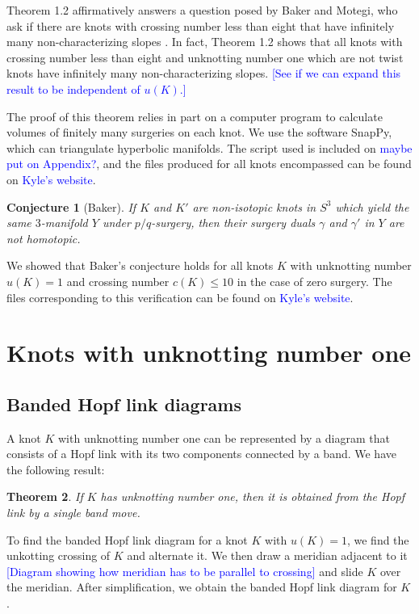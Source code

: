 \documentclass[11pt,usenames,dvipsnames,reqno]{amsart}
\newtheorem{theorem}{Theorem}
\numberwithin{theorem}{section}
\newtheorem{conjecture}[theorem]{Conjecture}
\theoremstyle{ex}
\theoremstyle{rem}
\def\kh#1{\textcolor{Blue}{#1}}
\begin{document}
Theorem 1.2 affirmatively answers a question posed by Baker and Motegi, who ask if there are knots with crossing number less than eight that have infinitely many non-characterizing slopes \cite[Question~1.7]{baker-motegi}. In fact, Theorem 1.2 shows that all knots with crossing number less than eight and unknotting number one which are not twist knots have infinitely many non-characterizing slopes. \kh{[See if we can expand this result to be independent of $u(K)$.]}

The proof of this theorem relies in part on a computer program to calculate volumes of finitely many surgeries on each knot. We use the software SnapPy, which can triangulate hyperbolic manifolds. The script used is included on \kh{maybe put on Appendix?}, and the files produced for all knots encompassed can be found on \kh{Kyle's website}.

\begin{conjecture}[Baker] If $K$ and $K'$ are non-isotopic knots in $S^3$ which yield the same $3$-manifold $Y$ under $p/q$-surgery, then their surgery duals $\gamma$ and $\gamma'$ in $Y$ are not homotopic.
\end{conjecture}

We showed that Baker's conjecture holds for all knots $K$ with unknotting number $u(K) = 1$ and crossing number $c(K) \leq 10$ in the case of zero surgery. The files corresponding to this verification can be found on \kh{Kyle's website}.


\section{Knots with unknotting number one}\label{sec:unknotting-one}


\subsection{Banded Hopf link diagrams}\label{band} A knot $K$ with unknotting number one can be represented by a diagram that consists of a Hopf link with its two components connected by a band. We have the following result:

\begin {theorem} If $K$ has unknotting number one, then it is obtained from the Hopf link by a single band move.
\end{theorem}

To find the banded Hopf link diagram for a knot $K$ with $u(K) =1$, we find the unkotting crossing of $K$ and alternate it. We then draw a meridian adjacent to it \kh{[Diagram showing how meridian has to be parallel to crossing]} and slide $K$ over the meridian. After simplification, we obtain the banded Hopf link diagram for $K$. 
\end{document}
